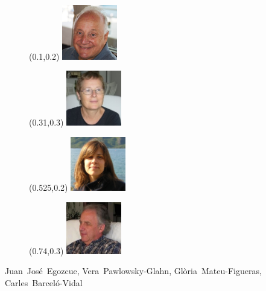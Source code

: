 \documentclass[dark]{cgem-presentation}
\begin{document}
\begin{frame}[plain]
	\begin{figure}
		\begin{textblock*}{2.1cm}(0.1\paperwidth,0.2\paperheight)
			\includegraphics[width=2.4cm]{egozcue}
		\end{textblock*}
	\end{figure}
	\begin{figure}
		\begin{textblock*}{2.1cm}(0.31\paperwidth,0.3\paperheight)
			\includegraphics[width=2.4cm]{pawlowsky-glahn}
		\end{textblock*}
	\end{figure}
	\begin{figure}
		\begin{textblock*}{2.1cm}(0.525\paperwidth,0.2\paperheight)
			\includegraphics[width=2.4cm]{mateu-figueras}
		\end{textblock*}
	\end{figure}
	\begin{figure}
		\begin{textblock*}{2.1cm}(0.74\paperwidth,0.3\paperheight)
			\includegraphics[width=2.4cm]{barcelo-vidal}
		\end{textblock*}
	\end{figure}
	\vspace{4cm}
	\begin{center}
		\Large
		Juan~Jos\'e~Egozcue, Vera~Pawlowsky-Glahn, 
		Gl\`oria~Mateu-Figueras, Carles~Barcel\'o-Vidal
	\end{center}
\end{frame}
\end{document}
